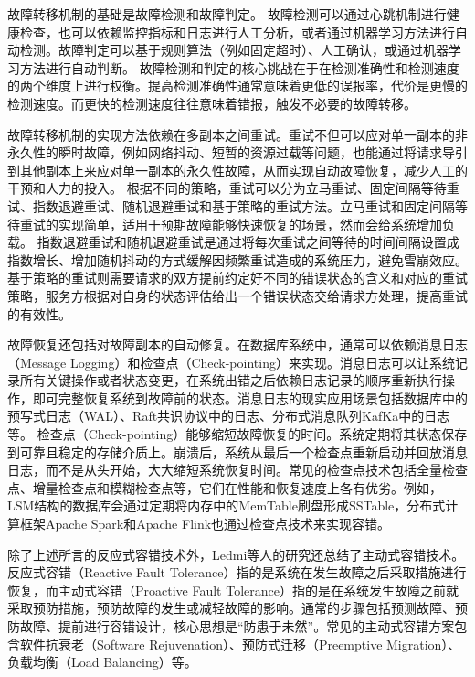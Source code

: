 故障转移机制的基础是故障检测和故障判定。
故障检测可以通过心跳机制进行健康检查，也可以依赖监控指标和日志进行人工分析，或者通过机器学习方法进行自动检测。故障判定可以基于规则算法（例如固定超时）、人工确认，或通过机器学习方法进行自动判断。
故障检测和判定的核心挑战在于在检测准确性和检测速度的两个维度上进行权衡。提高检测准确性通常意味着更低的误报率，代价是更慢的检测速度。而更快的检测速度往往意味着错报，触发不必要的故障转移。

故障转移机制的实现方法依赖在多副本之间重试。重试不但可以应对单一副本的非永久性的瞬时故障，例如网络抖动、短暂的资源过载等问题，也能通过将请求导引到其他副本上来应对单一副本的永久性故障，从而实现自动故障恢复，减少人工的干预和人力的投入。
根据不同的策略，重试可以分为立马重试、固定间隔等待重试、指数退避重试、随机退避重试和基于策略的重试方法。立马重试和固定间隔等待重试的实现简单，适用于预期故障能够快速恢复的场景，然而会给系统增加负载。
指数退避重试和随机退避重试是通过将每次重试之间等待的时间间隔设置成指数增长、增加随机抖动的方式缓解因频繁重试造成的系统压力，避免雪崩效应。基于策略的重试则需要请求的双方提前约定好不同的错误状态的含义和对应的重试策略，服务方根据对自身的状态评估给出一个错误状态交给请求方处理，提高重试的有效性。

故障恢复还包括对故障副本的自动修复。在数据库系统中，通常可以依赖消息日志（Message Logging）和检查点（Check-pointing）来实现。消息日志可以让系统记录所有关键操作或者状态变更，在系统出错之后依赖日志记录的顺序重新执行操作，即可完整恢复系统到故障前的状态。消息日志的现实应用场景包括数据库中的预写式日志（WAL）、Raft共识协议中的日志、分布式消息队列KafKa中的日志等。
检查点（Check-pointing）能够缩短故障恢复的时间。系统定期将其状态保存到可靠且稳定的存储介质上。崩溃后，系统从最后一个检查点重新启动并回放消息日志，而不是从头开始，大大缩短系统恢复时间。常见的检查点技术包括全量检查点、增量检查点和模糊检查点等，它们在性能和恢复速度上各有优劣。例如，LSM结构\cite{o1996lsmtree}的数据库会通过定期将内存中的MemTable刷盘形成SSTable，分布式计算框架Apache Spark\cite{zaharia2016spark}和Apache Flink\cite{carbone2015flink}也通过检查点技术来实现容错。


除了上述所言的反应式容错技术外，Ledmi\cite{ledmi2018fault}等人的研究还总结了主动式容错技术。
反应式容错（Reactive Fault Tolerance）指的是系统在发生故障之后采取措施进行恢复，而主动式容错（Proactive Fault Tolerance）指的是在系统发生故障之前就采取预防措施，预防故障的发生或减轻故障的影响。通常的步骤包括预测故障、预防故障、提前进行容错设计，核心思想是“防患于未然”。常见的主动式容错方案包含软件抗衰老（Software Rejuvenation）、预防式迁移（Preemptive Migration）、负载均衡（Load Balancing）等。

